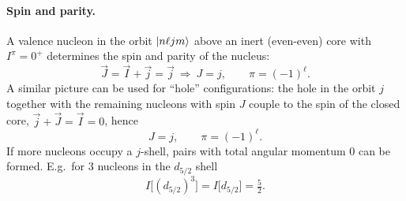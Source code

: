 \documentclass[11pt,a4paper]{article}
\begin{document}
\paragraph{Spin and parity.} A valence nucleon in the orbit $\ket{n\ell jm}$ above an inert (even-even) core with $I^\pi=0^+$ determines the spin and parity of the nucleus:
\[
\vec J=\vec I+\vec j=\vec j\ \Rightarrow\ J=j,\qquad \pi=(-1)^\ell .
\]
A similar picture can be used for ``hole'' configurations: the hole in the orbit $j$ together with the remaining nucleons with spin $J$ couple to the spin of the closed core, $\vec j+\vec J=\vec I=0$, hence
\[
J=j,\qquad \pi=(-1)^\ell .
\]
If more nucleons occupy a $j$-shell, pairs with total angular momentum 0 can be formed. E.g.\ for 3 nucleons in the $d_{5/2}$ shell
\[
I\big[(d_{5/2})^3\big]=I\big[d_{5/2}\big]=\tfrac52 .
\]
\end{document}
